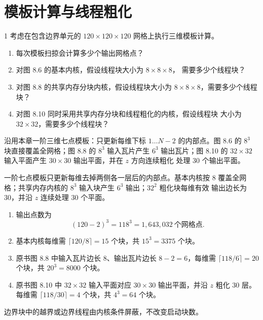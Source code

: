 \chapter{模板计算与线程粗化}

\begin{solutionexercise}{1}
\problemheading 考虑在包含边界单元的 $120\times120\times120$ 网格上执行三维模板计算。
\begin{enumerate}[label=\alph*.,leftmargin=2.2em]
  \item 每次模板扫掠会计算多少个输出网格点？
  \item 对图 8.6 的基本内核，假设线程块大小为 $8\times8\times8$，
  需要多少个线程块？
  \item 对图 8.8 的共享内存分块内核，假设线程块大小为
  $8\times8\times8$，需要多少个线程块？
  \item 对图 8.10 同时采用共享内存分块和线程粗化的内核，假设线程块
  大小为 $32\times32$，需要多少个线程块？
\end{enumerate}
沿用本章一阶三维七点模板：只更新每维下标 $1\ldots N-2$ 的内部点。图 8.6 的
$8^3$ 块直接覆盖全网格；图 8.8 的 $8^3$ 输入瓦片产生 $6^3$ 输出瓦片；图 8.10
的 $32\times32$ 输入平面产生 $30\times30$ 输出平面，并在 $z$ 方向连续粗化
处理 30 个输出平面。

\approachheading 一阶七点模板只更新每维去掉两侧各一层后的内部点。基本内核按 8
覆盖全网格；共享内存内核的 $8^3$ 输入块产生 $6^3$ 输出；$32^2$ 粗化块每维有效
输出边长为 30，并沿 $z$ 连续处理 30 个平面。

\answerheading
\begin{enumerate}[label=\alph*.,leftmargin=2.2em]
\item 输出点数为
\[
(120-2)^3=118^3=1{,}643{,}032\ \text{个网格点}.
\]
\item 基本内核每维需 $\lceil120/8\rceil=15$ 个块，共
$15^3=3375$ 个块。
\item 原书图 8.8 中输入瓦片边长 8、输出瓦片边长 $8-2=6$，每维需
$\lceil118/6\rceil=20$ 个块，共 $20^3=8000$ 个块。
\item 原书图 8.10 中 $32\times32$ 输入平面对应 $30\times30$ 输出平面，并沿
$z$ 粗化 30 层。每维需 $\lceil118/30\rceil=4$ 个块，共 $4^3=64$ 个块。
\end{enumerate}
边界块中的越界或边界线程由内核条件屏蔽，不改变启动块数。


\end{solutionexercise}
